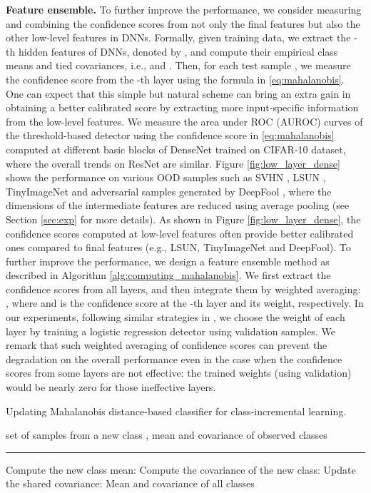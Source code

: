 \documentclass{article}
\begin{document}
{\bf Feature ensemble.}
To further improve the performance,
we consider measuring and combining the confidence scores
from not only the final features but also the other low-level features in DNNs.
Formally, given training data, we extract the -th hidden features of DNNs, denoted by , and compute their empirical class means and tied covariances, i.e.,  and . Then, for each test sample , we measure the confidence score from the -th layer using the formula in \eqref{eq:mahalanobis}.
One can expect that this simple but natural scheme can bring an extra gain in obtaining a better calibrated score by extracting more input-specific information from the low-level features.
We measure the area under ROC (AUROC) curves of the threshold-based detector using the confidence score in \eqref{eq:mahalanobis} computed at different basic blocks of DenseNet \citep{huang2017densely} trained on CIFAR-10 dataset, where the overall trends on ResNet are similar.
Figure \ref{fig:low_layer_dense} shows the performance on various
OOD samples such as {SVHN \citep{netzer2011reading}, LSUN \citep{yu2015lsun}, TinyImageNet 
and adversarial samples generated by DeepFool \citep{moosavi2016deepfool}}, 
where the dimensions of the intermediate features are reduced using average pooling (see Section \ref{sec:exp} for more details).
As shown in Figure \ref{fig:low_layer_dense},
the confidence scores computed at low-level features often provide better calibrated ones compared to final features (e.g., LSUN, TinyImageNet and DeepFool).
To further improve the performance,
we design a feature ensemble method as described in Algorithm \ref{alg:computing_mahalanobis}.
We first extract the confidence scores from all layers, and then integrate them by weighted averaging: , where  and  is the confidence score at the -th layer and its weight, respectively.
In our experiments, following similar strategies in \citep{ma2018characterizing}, we choose the weight of each layer  by training a logistic regression detector using validation samples.
We remark that such weighted averaging of confidence scores can prevent the degradation on the overall performance even in the case when the confidence scores from some layers are not effective: the trained weights (using validation) would be nearly zero for those ineffective layers.

\begin{algorithm}[t]
\caption{Updating Mahalanobis distance-based classifier for class-incremental learning.} \label{alg:update_mahalanobis}
\begin{algorithmic}
 set of samples from a new class , mean and covariance of observed classes 
\vspace{0.05in}
\hrule
\vspace{0.05in}
\State Compute the new class mean: 
\State Compute the covariance of the new class: 
\State Update the shared covariance: 
\State \Return Mean and covariance of all classes 
\end{algorithmic}
\end{algorithm}
\end{document}
